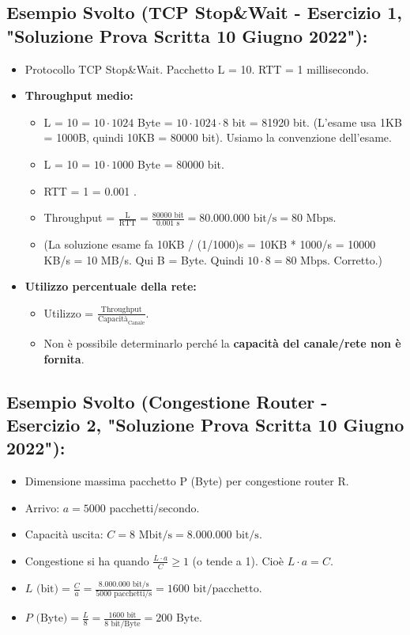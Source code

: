 \subsection{Esempio Svolto (TCP Stop\&Wait - Esercizio 1, "Soluzione Prova Scritta 10 Giugno 2022"):}
\begin{itemize}
    \item Protocollo TCP Stop\&Wait. Pacchetto L = 10. RTT = 1 millisecondo.
    \item \textbf{Throughput medio:}
    \begin{itemize}
        \item L = 10  = $10 \cdot 1024$ Byte = $10 \cdot 1024 \cdot 8$ bit = 81920 bit. (L'esame usa 1KB = 1000B, quindi 10KB = 80000 bit). Usiamo la convenzione dell'esame.
        \item L = 10  = $10 \cdot 1000$ Byte = 80000 bit.
        \item RTT = 1  = 0.001 .
        \item Throughput = $\frac{\text{L}}{\text{RTT}} = \frac{80000 \text{ bit}}{0.001 \text{ s}} = 80.000.000 \text{ bit/s} = 80 \text{ Mbps}$.
        \item (La soluzione esame fa 10KB / (1/1000)s = 10KB * 1000/s = 10000 KB/s = 10 MB/s. Qui B = Byte. Quindi $10 \cdot 8 = 80 \text{ Mbps}$. Corretto.)
    \end{itemize}
    \item \textbf{Utilizzo percentuale della rete:}
    \begin{itemize}
        \item Utilizzo = $\frac{\text{Throughput}}{\text{Capacità}_{\text{Canale}}}$.
        \item Non è possibile determinarlo perché la \textbf{capacità del canale/rete non è fornita}.
    \end{itemize}
\end{itemize}

\subsection{Esempio Svolto (Congestione Router - Esercizio 2, "Soluzione Prova Scritta 10 Giugno 2022"):}
\begin{itemize}
    \item Dimensione massima pacchetto P (Byte) per congestione router R.
    \item Arrivo: $a = 5000$ pacchetti/secondo.
    \item Capacità uscita: $C = 8 \text{ Mbit/s} = 8.000.000 \text{ bit/s}$.
    \item Congestione si ha quando $\frac{L \cdot a}{C} \geq 1$ (o tende a 1). Cioè $L \cdot a = C$.
    \item $L \text{ (bit)} = \frac{C}{a} = \frac{8.000.000 \text{ bit/s}}{5000 \text{ pacchetti/s}} = 1600 \text{ bit/pacchetto}$.
    \item $P \text{ (Byte)} = \frac{L}{8} = \frac{1600 \text{ bit}}{8 \text{ bit/Byte}} = 200 \text{ Byte}$.
\end{itemize}

